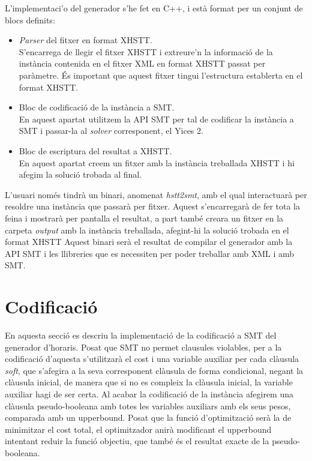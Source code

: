 \documentclass[11pt,a4paper,twoside]{report}
\begin{document}
  L'implementaci'o del generador s'he fet en C++, i està format per un conjunt de blocs definits:\
  \begin{itemize}
    \item \textit{Parser }del fitxer en format XHSTT. \\ S'encarrega de llegir el fitxer XHSTT i extreure'n la informació de la instància contenida en el fitxer XML en format XHSTT passat per paràmetre. És important que aquest fitxer tingui l'estructura establerta en el format XHSTT.
    \item Bloc de codificació de la instància a SMT. \\ En aquest apartat utilitzem la API SMT per tal de codificar la instància a SMT i passar-la al \textit{solver} corresponent, el Yices 2.
    \item Bloc de escriptura del resultat a XHSTT. \\ En aquest apartat creem un fitxer amb la instància treballada XHSTT i hi afegim la solució trobada al final.
  \end{itemize}

  L'usuari només tindrà un binari, anomenat \textit{hstt2smt}, amb el qual interactuarà per resoldre una instància que passarà per fitxer. Aquest s'encarregarà de fer tota la feina i mostrarà per pantalla el resultat, a part també creara un fitxer en la carpeta \textit{output} amb la instància treballada, afegint-hi la solució trobada en el format XHSTT
  Aquest binari serà el resultat de compilar el generador amb la API SMT i les llibreries que es necessiten per poder treballar amb XML i amb SMT.

  \section{Codificació}
  En aquesta secció es descriu la implementació de la codificació a SMT del generador d'horaris. 
  Posat que SMT no permet clausules violables, per a la codificació d'aquesta s'utilitzarà el cost i una variable auxiliar per cada clàusula \textit{soft}, 
  que s'afegira a la seva corresponent clàusula de forma condicional, negant la clàusula inicial, de manera que si no es compleix la clàusula inicial, la variable auxiliar hagi de ser certa. Al acabar la codificació de la instància afegirem una clàusula pseudo-booleana amb totes les variables auxiliars amb els seus pesos, comparada amb un upperbound.
  Posat que la funció d'optimització serà la de minimitzar el cost total, el optimitzador anirà modificant el upperbound intentant reduir la funció objectiu, que també és el resultat exacte de la pseudo-booleana.
\end{document}

